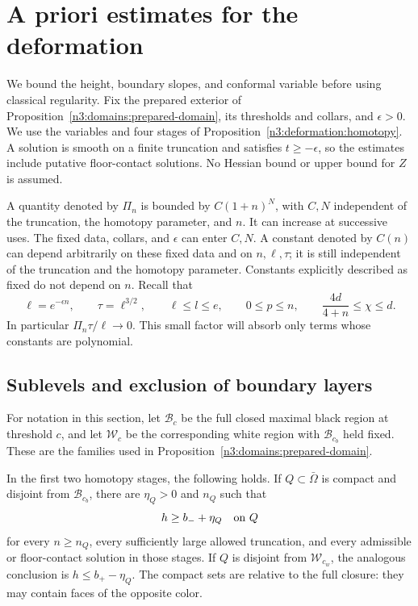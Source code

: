 \section{A priori estimates for the deformation}
\label{n3:apriori:section}

We bound the height, boundary slopes, and conformal variable before
using classical regularity. Fix the prepared exterior of
Proposition~\ref{n3:domains:prepared-domain}, its thresholds and collars,
and $\epsilon>0$. We use the variables and four stages of
Proposition~\ref{n3:deformation:homotopy}. A solution is smooth on a finite
truncation and satisfies $t\ge-\epsilon$, so the estimates include
putative floor-contact solutions. No Hessian bound or upper bound for
$Z$ is assumed.

A quantity denoted by $\Pi_n$
is bounded by $C(1+n)^N$, with $C,N$ independent of the truncation,
the homotopy parameter, and $n$.  It can increase at successive uses.
The fixed data, collars, and $\epsilon$ can enter $C,N$.  A constant
denoted by $C(n)$ can depend arbitrarily on these fixed data and on
$n,\ell,\tau$; it is still independent of the truncation and the
homotopy parameter.  Constants explicitly described as fixed do not
depend on $n$.  Recall that
\begin{equation}
 \ell=e^{-\epsilon n},\qquad \tau=\ell^{3/2},\qquad
 \ell\le l\le e,\qquad 0\le p\le n,
 \qquad \frac{4d}{4+n}\le\chi\le d.
 \label{n3:apriori:parameter-comparisons}
\end{equation}
In particular $\Pi_n\tau/\ell\to0$. This small factor will absorb
only terms whose constants are polynomial.

\subsection{Sublevels and exclusion of boundary layers}

For notation in this section, let $\mathcal B_c$ be the full closed
maximal black region at threshold $c$, and let $\mathcal W_c$ be the
corresponding white region with $\mathcal B_{c_b}$ held fixed.  These
are the families used in Proposition~\ref{n3:domains:prepared-domain}.

\begin{lemma}
\label{n3:apriori:sublevels}
In the first two homotopy stages, the following holds.  If
$Q\subset\bar\Omega$ is compact and disjoint from $\mathcal B_{c_b}$,
there are $\eta_Q>0$ and $n_Q$ such that
\begin{equation}
 h\ge b_-+\eta_Q\quad\hbox{on }Q
 \label{n3:apriori:lower-height}
\end{equation}
for every $n\ge n_Q$, every sufficiently large allowed truncation,
and every admissible or floor-contact solution in those stages.
If $Q$ is disjoint from $\mathcal W_{c_w}$, the analogous conclusion is
$h\le b_+-\eta_Q$.  The compact sets are relative to the full closure:
they may contain faces of the opposite color.
\end{lemma}

